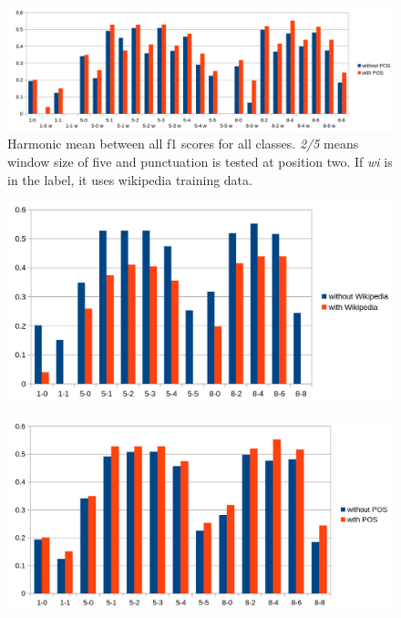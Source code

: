 \begin{figure}[ht]
    \centering
    \includegraphics[width=\textwidth]{img/window_eval.png}
    \caption{Harmonic mean between all f1 scores for all classes. \emph{2/5} means window size of five and punctuation is tested at position two. If \emph{wi} is in the label, it uses wikipedia training data.}
    \label{window_eval}
\end{figure}

\begin{figure}[ht]
    \centering
    \includegraphics[width=\textwidth]{img/window_wiki_eval.png}
    \caption{}
    \label{window_wiki_eval}
\end{figure}

\begin{figure}[ht]
    \centering
    \includegraphics[width=\textwidth]{img/window_pos_eval.png}
    \caption{}
    \label{window_pos_eval}
\end{figure}


